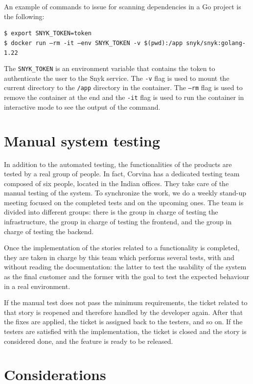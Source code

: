 An example of commands to issue for scanning dependencies in a Go project is the following:
\begin{mdframed}
  \texttt{\$ export SNYK\_TOKEN=token}\\
  \texttt{\$ docker run --rm -it --env SNYK\_TOKEN -v \$(pwd):/app snyk/snyk:golang-1.22}
\end{mdframed}
The \texttt{SNYK\_TOKEN} is an environment variable that contains the token to authenticate the user to the Snyk service. The \texttt{-v} flag is used to mount the current directory to the \texttt{/app} directory in the container. The \texttt{--rm} flag is used to remove the container at the end and the \texttt{-it} flag is used to run the container in interactive mode to see the output of the command.

\section{Manual system testing}

In addition to the automated testing, the functionalities of the products are tested by a real group of people. In fact, Corvina has a dedicated testing team composed of six people, located in the Indian offices. They take care of the manual testing of the system. To synchronize the work, we do a weekly stand-up meeting focused on the completed tests and on the upcoming ones. The team is divided into different groups: there is the group in charge of testing the infrastructure, the group in charge of testing the frontend, and the group in charge of testing the backend.

Once the implementation of the stories related to a functionality is completed, they are taken in charge by this team which performs several tests, with and without reading the documentation: the latter to test the usability of the system as the final customer and the former with the goal to test the expected behaviour in a real environment.

If the manual test does not pass the minimum requirements, the ticket related to that story is reopened and therefore handled by the developer again. After that the fixes are applied, the ticket is assigned back to the testers, and so on. If the testers are satisfied with the implementation, the ticket is closed and the story is considered done, and the feature is ready to be released.

\section{Considerations}


